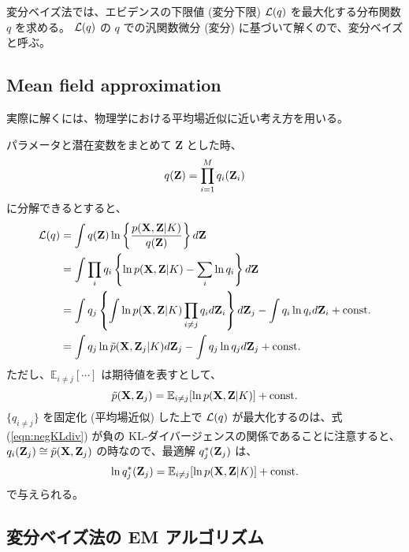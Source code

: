 変分ベイズ法では、エビデンスの下限値 (変分下限) ${\cal L}(q)$ を最大化する分布関数 $q$ を求める。
${\cal L}(q)$ の $q$ での汎関数微分 (変分) に基づいて解くので、変分ベイズと呼ぶ。


\subsection{ Mean field approximation }

実際に解くには、物理学における平均場近似に近い考え方を用いる。

パラメータと潜在変数をまとめて {\bf Z} とした時、
\begin{equation}
  q({\bf Z})  =  \prod_{i=1}^M q_i({\bf Z}_i)
\end{equation}
に分解できるとすると、
\begin{align}
  {\cal L}(q)  &=  \int q({\bf Z}) \ln \left\{ \frac{ p({\bf X}, {\bf Z} | K) }{ q({\bf Z}) } \right\} d{\bf Z}  \\
  &=  \int \prod_i q_i \left\{ \ln p({\bf X}, {\bf Z} | K)  -  \sum_i \ln q_i  \right\} d{\bf Z}  \\
  &=  \int q_j \left\{ \int \ln p({\bf X}, {\bf Z} | K) \prod_{i \neq j}q_i d{\bf Z}_i \right\} d{\bf Z}_j - \int q_i \ln q_i d{\bf Z}_i + {\rm const.}  \\
  &=  \int q_j \ln \tilde{p}({\bf X}, {\bf Z}_j | K) d{\bf Z}_j - \int q_j \ln q_j d{\bf Z}_j + {\rm const.}  \label{eqn:negKLdiv}
\end{align}
ただし、$\mathbb{E}_{i \neq j}[ \cdots ]$ は期待値を表すとして、
\begin{equation}
  \tilde{p}({\bf X}, {\bf Z}_j)  =  \mathbb{E}_{i \neq j}[ \ln p({\bf X}, {\bf Z} | K) ] + {\rm const.}
\end{equation}
$\{ q_{i \neq j}\}$ を固定化 (平均場近似) した上で ${\cal L}(q)$ が最大化するのは、式 (\ref{eqn:negKLdiv}) が負の KL-ダイバージェンスの関係であることに注意すると、$q_i({\bf Z}_j) \cong \tilde{p}({\bf X}, {\bf Z}_j)$ の時なので、最適解 $q_j^*({\bf Z}_j)$ は、
\begin{equation}
  \ln q_j^*({\bf Z}_j)  =  \mathbb{E}_{i \neq j}[ \ln p({\bf X}, {\bf Z} | K) ] + {\rm const.}
\end{equation}
で与えられる。


\subsection{ 変分ベイズ法の EM アルゴリズム }


